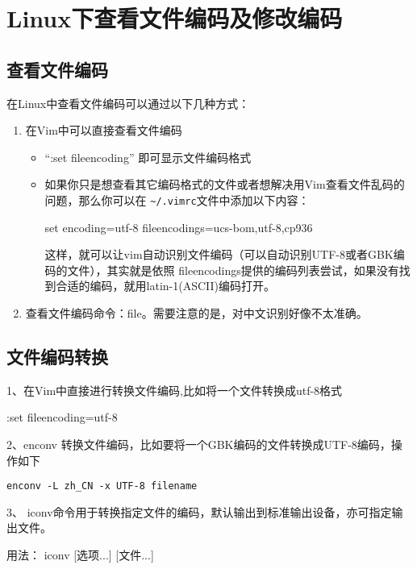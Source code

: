 {\section{Linux下查看文件编码及修改编码}
\subsection{查看文件编码}
在Linux中查看文件编码可以通过以下几种方式：
\begin{enumerate}
\item 在Vim中可以直接查看文件编码
\begin{itemize}
\item ``:set fileencoding'' 即可显示文件编码格式
\item 如果你只是想查看其它编码格式的文件或者想解决用Vim查看文件乱码的问题，那么你可以在
\verb|~/.vimrc|文件中添加以下内容：

set encoding=utf-8 fileencodings=ucs-bom,utf-8,cp936

这样，就可以让vim自动识别文件编码（可以自动识别UTF-8或者GBK编码的文件），其实就是依照 fileencodings提供的编码列表尝试，如果没有找到合适的编码，就用latin-1(ASCII)编码打开。
\end{itemize}


\item 查看文件编码命令：file。需要注意的是，对中文识别好像不太准确。
\end{enumerate}



\subsection{文件编码转换}
1、在Vim中直接进行转换文件编码,比如将一个文件转换成utf-8格式

:set fileencoding=utf-8

2、enconv 转换文件编码，比如要将一个GBK编码的文件转换成UTF-8编码，操作如下

\verb|enconv -L zh_CN -x UTF-8 filename|

3、 iconv命令用于转换指定文件的编码，默认输出到标准输出设备，亦可指定输出文件。  

用法： iconv [选项...] [文件...]  

}
